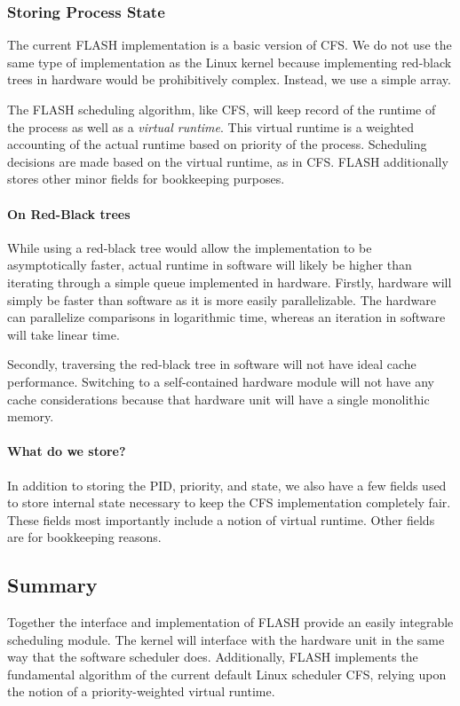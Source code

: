 \documentclass{sig-alternate-10pt}
\begin{document}
\subsubsection{Storing Process State}
The current FLASH implementation is a basic version of CFS.  We do not use
the same type of implementation as the Linux kernel because implementing
red-black trees in hardware would be prohibitively complex.  Instead, we use
a simple array.

The FLASH scheduling algorithm, like CFS, will keep record of the runtime of
the process as well as a \emph{virtual runtime}.  This virtual runtime is
a weighted accounting of the actual runtime based on priority of the
process.  Scheduling decisions are made based on the virtual runtime, as in
CFS.  FLASH additionally stores other minor fields for bookkeeping purposes.

\paragraph{On Red-Black trees}
While using a red-black tree would allow the implementation to be
asymptotically faster, actual runtime in software will likely be higher than
iterating through a simple queue implemented in hardware.  Firstly, hardware
will simply be faster than software as it is more easily parallelizable.
The hardware can parallelize comparisons in logarithmic time, whereas an
iteration in software will take linear time.

Secondly, traversing the red-black tree in software will not have ideal cache
performance. Switching to a self-contained hardware module will not have any
cache considerations because that hardware unit will have a single
monolithic memory.

\paragraph{What do we store?}
In addition to storing the PID, priority, and state, we also have a few
fields used to store internal state necessary to keep the CFS implementation
completely fair.  These fields most importantly include a notion of virtual
runtime.  Other fields are for bookkeeping reasons.

\subsection{Summary}
Together the interface and implementation of FLASH provide an easily
integrable scheduling module.  The kernel will interface with the hardware
unit in the same way that the software scheduler does.  Additionally, FLASH
implements the fundamental algorithm of the current default Linux scheduler
CFS, relying upon the notion of a priority-weighted virtual runtime.
\end{document}
